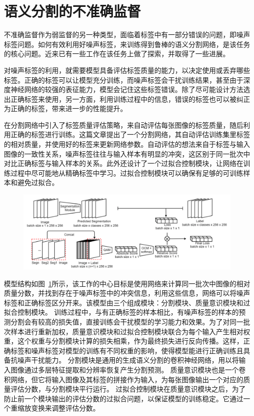 \section{语义分割的不准确监督}
不准确监督作为弱监督的另一种类型，面临着标签中有一部分错误的问题，即噪声标签问题。如何有效利用好噪声标签，来训练得到鲁棒的语义分割网络，是该任务的核心问题。近来已有一些工作在该任务上做了探索，并取得了一些进展。

对噪声标签的利用，就需要模型具备评估标签质量的能力，以决定使用或丢弃哪些标签。正确的标签可以让模型充分训练，而噪声标签会干扰训练结果，甚至由于深度神经网络的较强的表征能力，模型会记住这些标签错误。除了尽可能设计方法选出正确标签来使用，另一方面，利用训练过程中的信息，错误的标签也可以被纠正为正确的标签，带来进一步的性能提升。

\citet{Zhu2019PickandLearnAQ} 在分割网络中引入了标签质量评估策略，来自动评估每张图像的标签质量，随后利用正确的标签进行训练。这篇文章提出了一个分割网络，其自动评估训练集里标签的相对质量，并使用好的标签来更新网络参数。自动评估的想法来自于标签与输入图像的一致性关系，噪声标签往往与输入样本有明显的冲突，这区别于同一批次中对比正确标签与输入样本的关系。此外还设计了一个过拟合控制模块，让网络在训练过程中尽可能地从精确标签中学习。过拟合控制模块可以确保有足够的可训练样本和避免过拟合。
    \begin{figure}[tbp]
        \centering 
        \includegraphics[width=1.0\textwidth]{img/c2/rel_c1.png}
        \label{c2_fig11}
    \end{figure}

模型结构如图~\ref{c2_fig11}所示，该工作的中心目标是使用网络来计算同一批次中图像的相对质量分数，并找到存在于噪声标签中的冲突信息，利用这些信息，网络可以将噪声标签和正确标签区分开来。该模型由三个组成模块：分割模块、质量意识模块和过拟合控制模块。
训练过程中，与有正确标签的样本相比，有噪声标签的样本的预测分割会有较高的损失值，直接训练会干扰模型的学习能力和效果。为了对同一批次样本进行重新加权，质量意识模块和过拟合控制模块联合为每个输入产生相对权重，这个权重与分割模块计算的损失相乘，作为最终损失进行反向传播。这样，正确标签和噪声标签对模型的训练有不同权重的影响，使得模型能进行正确训练且具备抗噪声干扰能力。
分割模块是通用的生成语义分割的卷积神经网络，用以将输入图像通过多层特征提取和分辨率恢复产生分割预测。
质量意识模块也是一个卷积网络，但它将输入图像及其标签的拼接作为输入，为每张图像输出一个对应的质量评估分数，与分割模块平行运行。
过拟合控制模块在质量意识模块之后，为了防止前一个模块输出的评估分数的过拟合问题，以保证模型的训练稳定。它通过一个重缩放变换来调整评估分数。

